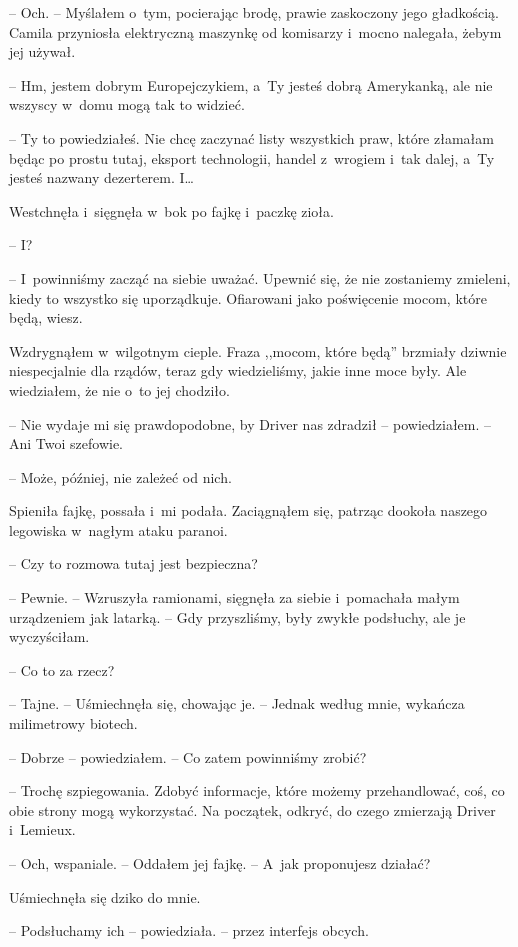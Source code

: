 \documentclass[oneside,polish,12pt,sfheadings]{mwbk}
\begin{document}
-- Och. -- Myślałem o~tym, pocierając brodę, prawie zaskoczony jego
gładkością. Camila przyniosła elektryczną maszynkę od komisarzy i~mocno
nalegała, żebym jej używał.

-- Hm, jestem dobrym Europejczykiem, a~Ty jesteś dobrą Amerykanką, ale
nie wszyscy w~domu mogą tak to widzieć.

-- Ty to powiedziałeś. Nie chcę zaczynać listy wszystkich praw, które
złamałam będąc po prostu tutaj, eksport technologii, handel z~wrogiem i~tak dalej, a~Ty jesteś nazwany dezerterem. I\ldots

Westchnęła i~sięgnęła w~bok po fajkę i~paczkę zioła.

-- I?

-- I~powinniśmy zacząć na siebie uważać. Upewnić się, że nie zostaniemy
zmieleni, kiedy to wszystko się uporządkuje. Ofiarowani jako poświęcenie
mocom, które będą, wiesz.

Wzdrygnąłem w~wilgotnym cieple. Fraza ,,mocom, które będą'' brzmiały
dziwnie niespecjalnie dla rządów, teraz gdy wiedzieliśmy, jakie inne
moce były. Ale wiedziałem, że nie o~to jej chodziło.

-- Nie wydaje mi się prawdopodobne, by Driver nas zdradził --
powiedziałem. -- Ani Twoi szefowie.

-- Może, później, nie zależeć od nich.

Spieniła fajkę, possała i~mi podała. Zaciągnąłem się, patrząc dookoła
naszego legowiska w~nagłym ataku paranoi.

-- Czy to rozmowa tutaj jest bezpieczna?

-- Pewnie. -- Wzruszyła ramionami, sięgnęła za siebie i~pomachała małym
urządzeniem jak latarką. -- Gdy przyszliśmy, były zwykłe podsłuchy, ale
je wyczyściłam.

-- Co to za rzecz?

-- Tajne. -- Uśmiechnęła się, chowając je. -- Jednak według mnie, wykańcza
milimetrowy biotech.

-- Dobrze -- powiedziałem. -- Co zatem powinniśmy zrobić?

-- Trochę szpiegowania. Zdobyć informacje, które możemy przehandlować,
coś, co obie strony mogą wykorzystać. Na początek, odkryć, do czego
zmierzają Driver i~Lemieux.

-- Och, wspaniale. -- Oddałem jej fajkę. -- A~jak proponujesz działać?

Uśmiechnęła się dziko do mnie.

-- Podsłuchamy ich -- powiedziała. -- przez interfejs obcych.
\end{document}
